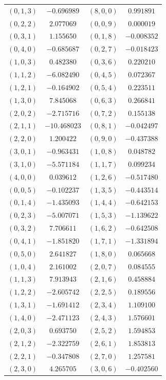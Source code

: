 \begin{table}
\begin{tabular}{cc@{\qquad}cc}
$(0,1,3)$ & $-0.696989$ & $(8,0,0)$ & $0.991891$ \\
$(0,2,2)$ & $2.077069$ & $(0,0,9)$ & $0.000019$ \\
$(0,3,1)$ & $1.155650$ & $(0,1,8)$ & $-0.008352$ \\
$(0,4,0)$ & $-0.685687$ & $(0,2,7)$ & $-0.018423$ \\
$(1,0,3)$ & $0.482380$ & $(0,3,6)$ & $0.220210$ \\
$(1,1,2)$ & $-6.082490$ & $(0,4,5)$ & $0.072367$ \\
$(1,2,1)$ & $-0.164902$ & $(0,5,4)$ & $0.223511$ \\
$(1,3,0)$ & $7.845068$ & $(0,6,3)$ & $0.266841$ \\
$(2,0,2)$ & $-2.715716$ & $(0,7,2)$ & $0.155138$ \\
$(2,1,1)$ & $-10.468023$ & $(0,8,1)$ & $-0.042497$ \\
$(2,2,0)$ & $1.200422$ & $(0,9,0)$ & $-0.437388$ \\
$(3,0,1)$ & $-0.963431$ & $(1,0,8)$ & $0.048782$ \\
$(3,1,0)$ & $-5.571184$ & $(1,1,7)$ & $0.099234$ \\
$(4,0,0)$ & $0.039612$ & $(1,2,6)$ & $-0.517480$ \\
$(0,0,5)$ & $-0.102237$ & $(1,3,5)$ & $-0.443514$ \\
$(0,1,4)$ & $-1.435093$ & $(1,4,4)$ & $-0.642153$ \\
$(0,2,3)$ & $-5.007071$ & $(1,5,3)$ & $-1.139622$ \\
$(0,3,2)$ & $7.706611$ & $(1,6,2)$ & $-0.642508$ \\
$(0,4,1)$ & $-1.851820$ & $(1,7,1)$ & $-1.331894$ \\
$(0,5,0)$ & $2.641827$ & $(1,8,0)$ & $0.065668$ \\
$(1,0,4)$ & $2.161002$ & $(2,0,7)$ & $0.084555$ \\
$(1,1,3)$ & $7.913943$ & $(2,1,6)$ & $0.458884$ \\
$(1,2,2)$ & $-2.605742$ & $(2,2,5)$ & $0.189556$ \\
$(1,3,1)$ & $-1.691412$ & $(2,3,4)$ & $1.109100$ \\
$(1,4,0)$ & $-2.471123$ & $(2,4,3)$ & $1.576601$ \\
$(2,0,3)$ & $0.693750$ & $(2,5,2)$ & $1.594853$ \\
$(2,1,2)$ & $-2.322759$ & $(2,6,1)$ & $1.853813$ \\
$(2,2,1)$ & $-0.347808$ & $(2,7,0)$ & $1.257581$ \\
$(2,3,0)$ & $4.265705$ & $(3,0,6)$ & $-0.402560$ \\

\end{tabular}
\end{table}
